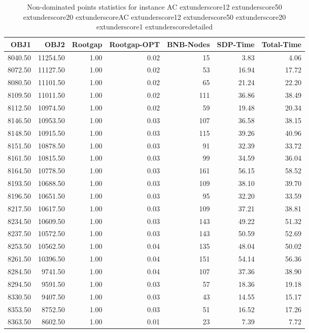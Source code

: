 \begin{table}
\caption{Non-dominated points statistics for instance AC	extunderscore12	extunderscore50	extunderscore20	extunderscoreAC	extunderscore12	extunderscore50	extunderscore20	extunderscore1	extunderscoredetailed}
\label{tab:stats/AC_12_50_20_AC_12_50_20_1_detailed}
\begin{tabular}{rrrrrrr}
\toprule
OBJ1 & OBJ2 & Rootgap & Rootgap-OPT & BNB-Nodes & SDP-Time & Total-Time \\
\midrule
8040.50 & 11254.50 & 1.00 & 0.02 & 15 & 3.83 & 4.06 \\
8072.50 & 11127.50 & 1.00 & 0.02 & 53 & 16.94 & 17.72 \\
8080.50 & 11101.50 & 1.00 & 0.02 & 65 & 21.24 & 22.20 \\
8109.50 & 11011.50 & 1.00 & 0.02 & 111 & 36.86 & 38.49 \\
8112.50 & 10974.50 & 1.00 & 0.02 & 59 & 19.48 & 20.34 \\
8146.50 & 10953.50 & 1.00 & 0.03 & 107 & 36.58 & 38.15 \\
8148.50 & 10915.50 & 1.00 & 0.03 & 115 & 39.26 & 40.96 \\
8151.50 & 10878.50 & 1.00 & 0.03 & 91 & 32.39 & 33.72 \\
8161.50 & 10815.50 & 1.00 & 0.03 & 99 & 34.59 & 36.04 \\
8164.50 & 10778.50 & 1.00 & 0.03 & 161 & 56.15 & 58.52 \\
8193.50 & 10688.50 & 1.00 & 0.03 & 109 & 38.10 & 39.70 \\
8196.50 & 10651.50 & 1.00 & 0.03 & 95 & 32.20 & 33.59 \\
8217.50 & 10617.50 & 1.00 & 0.03 & 109 & 37.21 & 38.81 \\
8234.50 & 10609.50 & 1.00 & 0.03 & 143 & 49.22 & 51.32 \\
8237.50 & 10572.50 & 1.00 & 0.03 & 143 & 50.59 & 52.69 \\
8253.50 & 10562.50 & 1.00 & 0.04 & 135 & 48.04 & 50.02 \\
8261.50 & 10396.50 & 1.00 & 0.04 & 151 & 54.14 & 56.36 \\
8284.50 & 9741.50 & 1.00 & 0.04 & 107 & 37.36 & 38.90 \\
8294.50 & 9591.50 & 1.00 & 0.03 & 57 & 18.36 & 19.18 \\
8330.50 & 9407.50 & 1.00 & 0.03 & 43 & 14.55 & 15.17 \\
8353.50 & 8752.50 & 1.00 & 0.03 & 51 & 16.52 & 17.26 \\
8363.50 & 8602.50 & 1.00 & 0.01 & 23 & 7.39 & 7.72 \\

\end{tabular}
\end{table}
